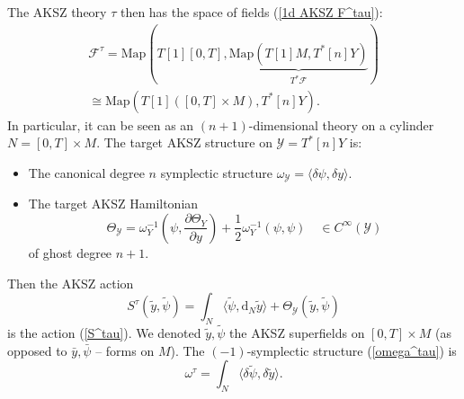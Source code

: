 \documentclass{amsart}
\theoremstyle{plain} %
\theoremstyle{definition}
\theoremstyle{remark}
\newcommand{\mc}{\mathcal}
\newcommand{\mr}{\mathrm}
\newcommand{\til}{\widetilde}
\newcommand{\F}{\mathcal{F}}
\newcommand{\dd}{\partial}
\newcommand{\dr}{\mathrm{d}}
\begin{document}
The AKSZ theory $\tau$ then has the space of fields (\ref{1d AKSZ F^tau}):
\begin{multline}
    \F^\tau=\mr{Map}(T[1][0,T],\underbrace{\mr{Map}(T[1]M,T^*[n]Y)}_{T^*\F})
    \\ \cong \mr{Map}(T[1]([0,T]\times M), T^*[n]Y).
\end{multline}
In particular, it can be seen as an $(n+1)$-dimensional theory on a cylinder $N=[0,T]\times M$. The target AKSZ structure on $\mc{Y}=T^*[n]Y$ is: 
\begin{itemize}
    \item The canonical degree $n$ symplectic structure $\omega_\mc{Y}=\langle \delta\psi,\delta y \rangle$.
    \item The target AKSZ Hamiltonian 
    \begin{equation}
        \Theta_\mc{Y}=\omega_Y^{-1}\left(\psi,\frac{\dd \Theta_Y}{\dd y}\right)+\frac12 \omega_Y^{-1}(\psi,\psi)\quad \in C^\infty(\mc{Y})
    \end{equation}
    of ghost degree $n+1$.
\end{itemize}
Then the AKSZ action
\begin{equation}
    S^\tau(\til{y},\til\psi)=\int_{N} \langle \til\psi,\dr_N\til{y} \rangle + \Theta_\mc{Y}(\til{y},\til\psi)
\end{equation}
is the action (\ref{S^tau}). We denoted $\til{y},\til\psi$ the AKSZ superfields on $[0,T]\times M$ (as opposed to $\bar{y},\bar\psi$ -- forms %
on $M$). The $(-1)$-symplectic structure (\ref{omega^tau}) is
\begin{equation}
    \omega^\tau= \int_{N} \langle \delta\til\psi, \delta \til{y}\rangle.
\end{equation}
\end{document}
